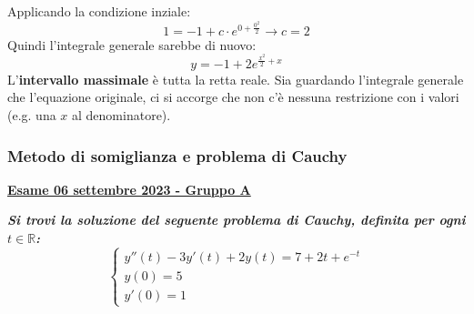 \documentclass[a4paper]{article}
\newcommand{\definition}[1]{\textcolor{Red3}{\textbf{#1}}}
\newcommand{\example}[1]{\textcolor{Green4}{\textbf{#1}}}
\begin{document}
	Applicando la condizione inziale:
	\begin{equation*}
		1 = -1 + c \cdot e^{0+\frac{0^{2}}{2}} \longrightarrow c = 2
	\end{equation*}
	Quindi l'integrale generale sarebbe di nuovo:
	\begin{equation*}
		y = - 1 + 2e^{\frac{x^{2}}{2} + x}
	\end{equation*}
	L'\textbf{intervallo massimale} è tutta la retta reale. Sia guardando l'integrale generale che l'equazione originale, ci si accorge che non c'è nessuna restrizione con i valori (e.g. una $x$ al denominatore).\newpage

	\subsubsection{Metodo di somiglianza e problema di Cauchy}\label{subsubsection: metodo di somiglianza e problema di Cauchy}
	
	\begin{flushleft}
		\definition{\underline{Esame 06 settembre 2023 - Gruppo A}}
		\label{exam: esame 06 settembre 2023 - Gruppo A - 2 esercizio}
	\end{flushleft}
	\example{\emph{Si trovi la soluzione del seguente problema di Cauchy, definita per ogni $t \in \mathbb{R}$:}
	\begin{equation*}
		\begin{cases}
			y''\left(t\right) - 3y'\left(t\right) + 2y\left(t\right) = 7 + 2t + e^{-t} \\
			y\left(0\right) = 5 \\
			y'\left(0\right) = 1
		\end{cases}
	\end{equation*}}
\end{document}
